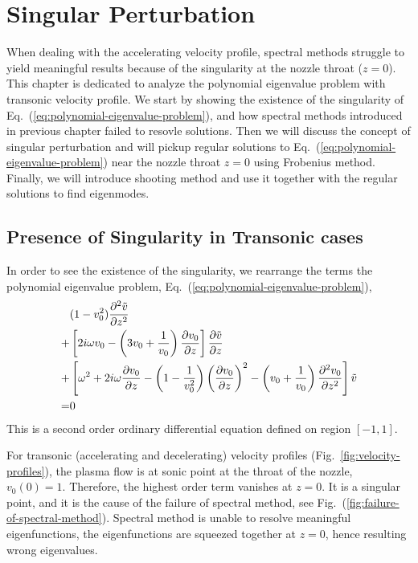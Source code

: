 \chapter{Singular Perturbation} \label{chap:singular-perturbation}
When dealing with the accelerating velocity profile, spectral methods struggle to yield meaningful results because of the singularity at the nozzle throat ($z=0$). This chapter is dedicated to analyze the polynomial eigenvalue problem with transonic velocity profile. We start by showing the existence of the singularity of Eq.~(\ref{eq:polynomial-eigenvalue-problem}), and how spectral methods introduced in previous chapter failed to resovle solutions. Then we will discuss the concept of singular perturbation and will pickup regular solutions to Eq.~(\ref{eq:polynomial-eigenvalue-problem}) near the nozzle throat $z=0$ using Frobenius method. Finally, we will introduce shooting method and use it together with the regular solutions to find eigenmodes.

\section{Presence of Singularity in Transonic cases} \label{sec:presence-of-singularity}
In order to see the existence of the singularity, we rearrange the terms the polynomial eigenvalue problem, Eq.~(\ref{eq:polynomial-eigenvalue-problem}),
\begin{equation} \label{eq:singular-perturbation-problem}
	\begin{aligned}
		  & (1-v_0^2)\pdv[2]{\tilde{v}}{z}                                                                                                                                        \\
		+ & \left[2i\omega v_0 - \left(3v_0 + \frac{1}{v_0}\right)\pdv{v_0}{z}\right]\pdv{\tilde{v}}{z}                                                                           \\
		+ & \left[\omega^2 + 2i\omega\pdv{v_0}{z} -\left(1 - \frac{1}{v_0^2}\right)\left(\pdv{v_0}{z}\right)^2 - \left(v_0 + \frac{1}{v_0}\right)\pdv[2]{v_0}{z} \right]\tilde{v} \\
		= & 0
	\end{aligned}
\end{equation}
This is a second order ordinary differential equation defined on region $[-1,1]$.

For transonic (accelerating and decelerating) velocity profiles (Fig.~\ref{fig:velocity-profiles}), the plasma flow is at sonic point at the throat of the nozzle, $v_0(0)=1$. Therefore, the highest order term vanishes at $z=0$. It is a singular point, and it is the  cause of the failure of spectral method, see Fig.~(\ref{fig:failure-of-spectral-method}). Spectral method is unable to resolve meaningful eigenfunctions, the eigenfunctions are squeezed together at $z=0$, hence resulting wrong eigenvalues.

